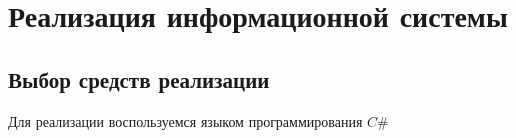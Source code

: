 \section{Реализация информационной системы}
\subsection{Выбор средств реализации}
Для реализации воспользуемся языком программирования $C\#$

\pagebreak